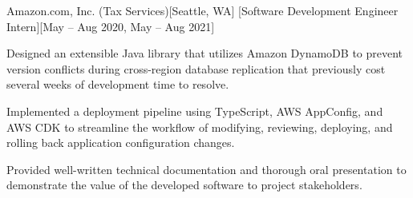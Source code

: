 \begin{ritemize}
{Amazon.com, Inc. (Tax Services)}[Seattle, WA]
[Software Development Engineer Intern][May -- Aug 2020, May -- Aug 2021]
	\item Designed an extensible Java library that utilizes Amazon DynamoDB to prevent version conflicts during cross-region database replication that previously cost several weeks of development time to resolve.
	\item Implemented a deployment pipeline using TypeScript, AWS AppConfig, and AWS CDK to streamline the workflow of modifying, reviewing, deploying, and rolling back application configuration changes.
	\item Provided well-written technical documentation and thorough oral presentation to demonstrate the value of the developed software to project stakeholders.
\end{ritemize}